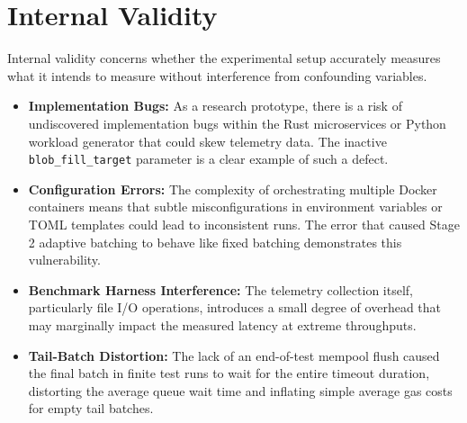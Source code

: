 \section{Internal Validity}
\label{sec:internal_validity}
Internal validity concerns whether the experimental setup accurately measures what it intends to measure without interference from confounding variables.
\begin{itemize}
    \item \textbf{Implementation Bugs:} As a research prototype, there is a risk of undiscovered implementation bugs within the Rust microservices or Python workload generator that could skew telemetry data. The inactive \texttt{blob\_fill\_target} parameter is a clear example of such a defect.
    \item \textbf{Configuration Errors:} The complexity of orchestrating multiple Docker containers means that subtle misconfigurations in environment variables or TOML templates could lead to inconsistent runs. The error that caused Stage 2 adaptive batching to behave like fixed batching demonstrates this vulnerability.
    \item \textbf{Benchmark Harness Interference:} The telemetry collection itself, particularly file I/O operations, introduces a small degree of overhead that may marginally impact the measured latency at extreme throughputs.
    \item \textbf{Tail-Batch Distortion:} The lack of an end-of-test mempool flush caused the final batch in finite test runs to wait for the entire timeout duration, distorting the average queue wait time and inflating simple average gas costs for empty tail batches.
\end{itemize}